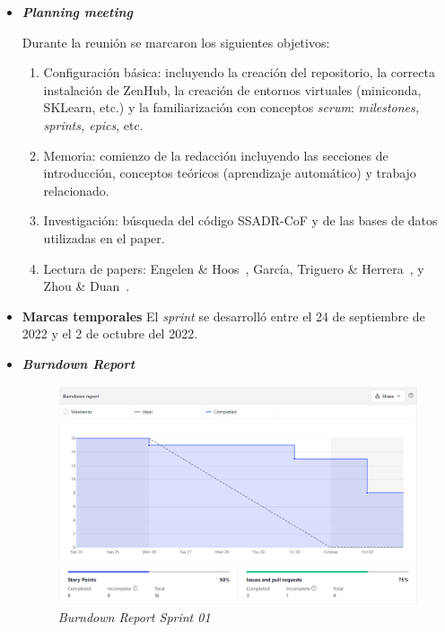 \begin{itemize}
	\item \textbf{\textit{Planning meeting}}
	
	Durante la reunión se marcaron los siguientes objetivos:
	
	\begin{enumerate}
		\item Configuración básica: incluyendo la creación del repositorio, la correcta instalación de ZenHub, la creación de entornos virtuales (miniconda, SKLearn, etc.) y la familiarización con conceptos \textit{scrum}: \textit{milestones, sprints, epics}, etc.
		\item Memoria: comienzo de la redacción incluyendo las secciones de introducción, conceptos teóricos (aprendizaje automático) y trabajo relacionado.
		\item Investigación: búsqueda del código SSADR-CoF y de las bases de datos utilizadas en el paper.
		\item Lectura de papers: Engelen \& Hoos~\cite{engelen2020surveyOnSemiSupervised}, García, Triguero \& Herrera~\cite{triguero2015SelflabeledTechniques}, y Zhou \& Duan~\cite{zhou2021SemisupervisedRecommendationAttack}.
	\end{enumerate}
	
	\item \textbf{Marcas temporales}
	El \textit{sprint} se desarrolló entre el 24 de septiembre de 2022 y el 2 de octubre del 2022.
	
	\item \textbf{\textit{Burndown Report}}
	\begin{figure}[h]
		\caption{\textit{Burndown Report Sprint 01}}
		\centering
		\includegraphics[width=\textwidth]{../img/anexos/s01_bdr}
	\end{figure}
	

\end{itemize}
